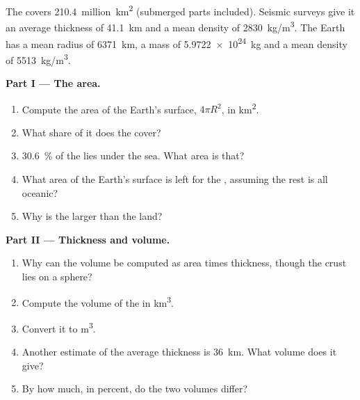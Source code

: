 \begin{problem}
\label{pb:g12:continental-crust:1}
The  covers \num{210.4}~million~\unit{km^2} (submerged parts
included). Seismic surveys give it an average thickness of \qty{41.1}{km} and
a mean density of \qty{2830}{kg/m^3}. The Earth has a mean radius of
\qty{6371}{km}, a mass of \qty{5.9722e24}{kg} and a mean density of
\qty{5513}{kg/m^3}.

\medskip
\noindent\textbf{Part I --- The area.}
\begin{enumerate}
  \item Compute the area of the Earth's surface, $4\pi R^2$, in
        \unit{km^2}.
  \item What share of it does the  cover?
  \item \qty{30.6}{\percent} of the  lies under the sea.
        What area is that?
  \item What area of the Earth's surface is left for the ,
        assuming the rest is all oceanic?
  \item Why is the  larger than the land?
\end{enumerate}

\medskip
\noindent\textbf{Part II --- Thickness and volume.}
\begin{enumerate}[resume]
  \item Why can the volume be computed as area times thickness, though the
        crust lies on a sphere?
  \item Compute the volume of the  in \unit{km^3}.
  \item Convert it to \unit{m^3}.
  \item Another estimate of the average thickness is \qty{36}{km}. What
        volume does it give?
  \item By how much, in percent, do the two volumes differ?
\end{enumerate}


\end{problem}
